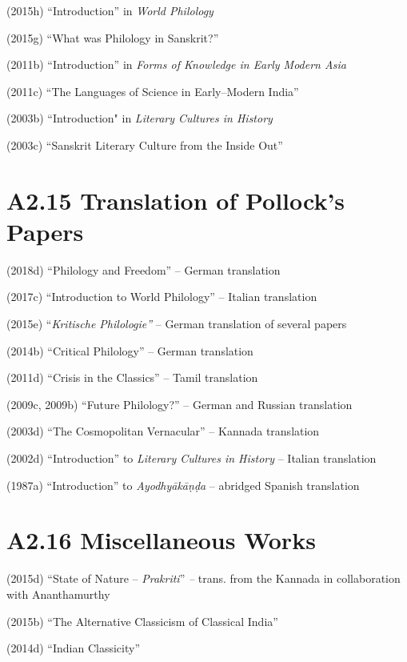 (2015h) “Introduction” in \textit{World Philology}

(2015g) “What was Philology in Sanskrit?”

(2011b) “Introduction” in \textit{Forms of Knowledge in Early Modern Asia}

(2011c) “The Languages of Science in Early–Modern India”

(2003b) “Introduction" in \textit{Literary Cultures in History}

(2003c) “Sanskrit Literary Culture from the Inside Out”


\section*{A2.15 Translation of Pollock’s Papers}

(2018d) “Philology and Freedom” – German translation

(2017c) “Introduction to World Philology” – Italian translation

(2015e) “\textit{Kritische Philologie”} – German translation of several papers

(2014b) “Critical Philology” – German translation

(2011d) “Crisis in the Classics” – Tamil translation

(2009c, 2009b) “Future Philology?” – German and Russian translation

(2003d) “The Cosmopolitan Vernacular” – Kannada translation

(2002d) “Introduction” to \textit{Literary Cultures in History} – Italian translation

(1987a) “Introduction” to \textit{Ayodhyākāṇḍa} – abridged Spanish translation


\section*{A2.16 Miscellaneous Works}

(2015d) “State of Nature – \textit{Prakriti}”\textit{ –} trans. from the Kannada in collaboration with Ananthamurthy

(2015b) “The Alternative Classicism of Classical India”

(2014d) “Indian Classicity”

